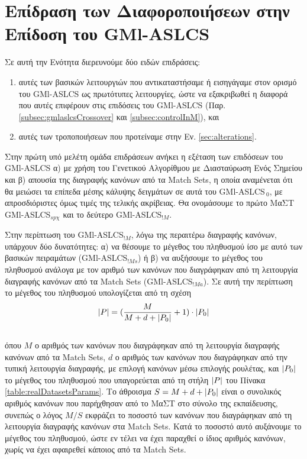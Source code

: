 \section{Επίδραση των Διαφοροποιήσεων στην Επίδοση του GMl-ASLCS}
Σε αυτή την Ενότητα διερευνούμε δύο ειδών επιδράσεις:
\begin{enumerate}
\item αυτές των βασικών λειτουργιών που αντικαταστήσαμε ή εισηγάγαμε στον ορισμό του GMl-ASLCS ως πρωτότυπες λειτουργίες, ώστε να εξακριβωθεί η διαφορά που αυτές επιφέρουν στις επιδόσεις του GMl-ASLCS (Παρ. \ref{subsec:gmlaslcsCrossover} και \ref{subsec:controlInM}), και
\item αυτές των τροποποιήσεων που προτείναμε στην Εν. \ref{sec:alterations}.
\end{enumerate}

Στην πρώτη υπό μελέτη ομάδα επιδράσεων ανήκει η εξέταση των επιδόσεων του GMl-ASLCS α) με χρήση του Γενετικού Αλγορίθμου με Διασταύρωση Ενός Σημείου και β) απουσία της διαγραφής κανόνων από τα Match Sets, η οποία αναμένεται ότι θα μειώσει τα επίπεδα μέσης κάλυψης δειγμάτων σε αυτά του GMl-ASLCS$_{\:0}$, με απροσδιόριστες όμως τιμές της τελικής ακρίβειας. Θα ονομάσουμε το πρώτο ΜαΣΤ GMl-ASLCS$_{sp\chi}$ και το δεύτερο GMl-ASLCS$_{!M}$. 

Στην περίπτωση του GMl-ASLCS$_{!M}$, λόγω της περαιτέρω διαγραφής κανόνων, υπάρχουν δύο δυνατότητες: α) να θέσουμε το μέγεθος του πληθυσμού ίσο με αυτό των βασικών πειραμάτων (GMl-ASLCS$_{!Ms}$) ή β) να αυξήσουμε το μέγεθος του πληθυσμού ανάλογα με τον αριθμό των κανόνων που διαγράφηκαν από τη λειτουργία διαγραφής κανόνων από τα Match Sets (GMl-ASLCS$_{!Ma}$). Σε αυτή την περίπτωση το μέγεθος του πληθυσμού υπολογίζεται από τη σχέση 
\begin{equation}
\label{eq:populationAugmentationFormula}
\lvert P\rvert=(\frac{M}{M+d+\lvert P_{0}\rvert} + 1) \cdot \lvert P_{0}\rvert
\end{equation}
\\
όπου $M$ ο αριθμός των κανόνων που διαγράφηκαν από τη λειτουργία διαγραφής κανόνων από τα Match Sets, $d$ ο αριθμός των κανόνων που διαγράφηκαν από την τυπική λειτουργία διαγραφής, με επιλογή κανόνων μέσω επιλογής ρουλέτας, και $\lvert P_{0}\rvert$ το μέγεθος του πληθυσμού που υπαγορεύεται από τη στήλη $\lvert P\rvert$ του Πίνακα \ref{table:realDatasetsParams}. Το άθροισμα $S=M+d+\lvert P_{0}\rvert$ είναι ο συνολικός αριθμός κανόνων που παρήχθησαν από το ΜαΣΤ στο σύνολο της εκπαίδευσης, συνεπώς ο λόγος $M/S$ εκφράζει το ποσοστό των κανόνων που διαγράφηκαν από τη λειτουργία διαγραφής κανόνων στα Match Sets. Κατά το ποσοστό αυτό αυξάνουμε το μέγεθος του πληθυσμού, ώστε εν τέλει να έχει παραχθεί ο ίδιος αριθμός κανόνων, χωρίς να έχει αφαιρεθεί κάποιος από τα Match Sets.

